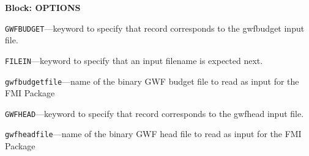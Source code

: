 
\item \textbf{Block: OPTIONS}

\begin{description}
\item \texttt{GWFBUDGET}---keyword to specify that record corresponds to the gwfbudget input file.

\item \texttt{FILEIN}---keyword to specify that an input filename is expected next.

\item \texttt{gwfbudgetfile}---name of the binary GWF budget file to read as input for the FMI Package

\item \texttt{GWFHEAD}---keyword to specify that record corresponds to the gwfhead input file.

\item \texttt{gwfheadfile}---name of the binary GWF head file to read as input for the FMI Package

\end{description}

